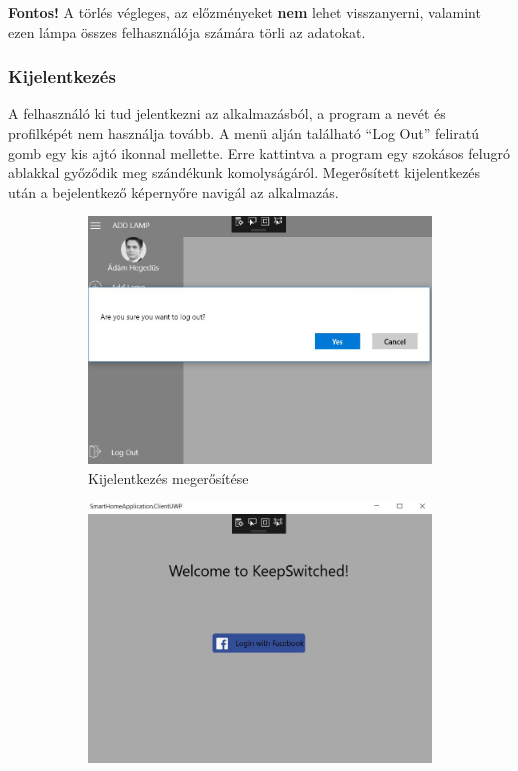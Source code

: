 \documentclass[a4paper,12pt]{report}
\begin{document}
    \textbf{Fontos!} A törlés végleges, az előzményeket \textbf{nem} lehet visszanyerni, valamint ezen lámpa összes felhasználója
    számára törli az adatokat.

    \subsubsection{Kijelentkezés}
    A felhasználó ki tud jelentkezni az alkalmazásból, a program a nevét és profilképét nem használja tovább. A menü alján
    található ``Log Out'' feliratú gomb egy kis ajtó ikonnal mellette. Erre kattintva a program egy szokásos felugró ablakkal
    győződik meg szándékunk komolyságáról. Megerősített kijelentkezés után a bejelentkező képernyőre navigál az alkalmazás.

    \begin{figure}[H]
        \centering
        \begin{subfigure}[b]{0.4\linewidth}
            \includegraphics[width=\linewidth]{images/logoutsure.jpg}
            \caption{Kijelentkezés megerősítése}
        \end{subfigure}
        \begin{subfigure}[b]{0.4\linewidth}
            \includegraphics[width=\linewidth]{images/logoutbacktologin.jpg}

\end{subfigure}
\end{figure}
\end{document}
